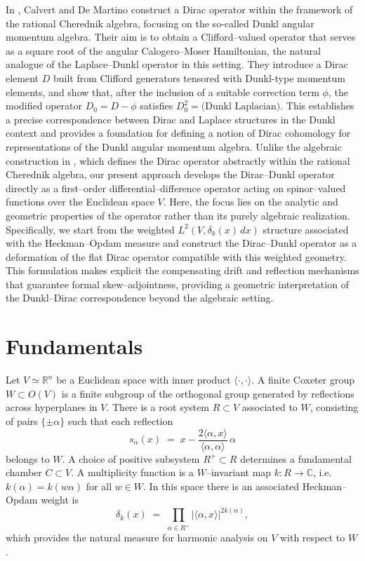 \documentclass[12pt]{article}
\newcommand{\1}{\mathbbm{1}}
\theoremstyle{definition}
\begin{document}
In \cite{CalvertDeMartino2021}, Calvert and De Martino construct a Dirac operator within 
the framework of the rational Cherednik algebra, focusing on the so-called 
{Dunkl angular momentum algebra}. Their aim is to obtain a Clifford--valued operator 
that serves as a square root of the angular Calogero--Moser Hamiltonian, the natural 
analogue of the Laplace--Dunkl operator in this setting. They introduce a Dirac element 
\(D\) built from Clifford generators tensored with Dunkl-type momentum elements, and 
show that, after the inclusion of a suitable correction term \(\phi\), the modified operator 
\(D_0 = D - \phi\) satisfies \(D_0^2 = \text{(Dunkl Laplacian)}\). This establishes a precise 
correspondence between Dirac and Laplace structures in the Dunkl context and provides 
a foundation for defining a notion of {Dirac cohomology} for representations of the 
Dunkl angular momentum algebra.
Unlike the algebraic construction in \cite{CalvertDeMartino2021}, which defines the Dirac 
operator abstractly within the rational Cherednik algebra, our present approach develops 
the {Dirac--Dunkl operator} directly as a first--order differential--difference operator 
acting on spinor--valued functions over the Euclidean space \(V\). Here, the focus lies on 
the analytic and geometric properties of the operator rather than its purely algebraic 
realization. Specifically, we start from the weighted \(L^{2}(V,\delta_{k}(x)\,dx)\) structure 
associated with the Heckman--Opdam measure and construct the Dirac--Dunkl operator 
as a deformation of the flat Dirac operator compatible with this weighted geometry. 
This formulation makes explicit the compensating drift and reflection mechanisms that 
guarantee formal skew--adjointness, providing a geometric interpretation of the 
Dunkl–Dirac correspondence beyond the algebraic setting.



\section{Fundamentals}

Let $V \simeq \mathbb{R}^{n}$ be a Euclidean space with inner product $\langle \cdot,\cdot \rangle$.
A {finite Coxeter group} $W \subset O(V)$ is a finite subgroup of the orthogonal group generated by reflections across
hyperplanes in $V$. There is a {root system} $R \subset V$ associated to $W$, consisting of
pairs $\{\pm \alpha\}$ such that each reflection
\[
s_\alpha(x) \;=\; x - \frac{2\langle \alpha, x\rangle}{\langle \alpha, \alpha\rangle} \,\alpha
\]
belongs to $W$. A choice of positive subsystem $R^{+} \subset R$ determines a
{fundamental chamber} $C \subset V$. A {multiplicity function} is a $W$--invariant map $k : R \to \mathbb{C}$, i.e.
$k(\alpha) = k(w\alpha)$ for all $w \in W$. In this space there is an associated {Heckman--Opdam weight} is
\begin{equation}\label{eq:HOweight}
  \delta_{k}(x) \;=\; \prod_{\alpha \in R^{+}} |\langle \alpha, x \rangle|^{2k(\alpha)} ,
\end{equation}
which provides the natural measure for harmonic analysis on $V$ with respect to $W$
\cite{HeckmanOpdam1987}.
\end{document}
